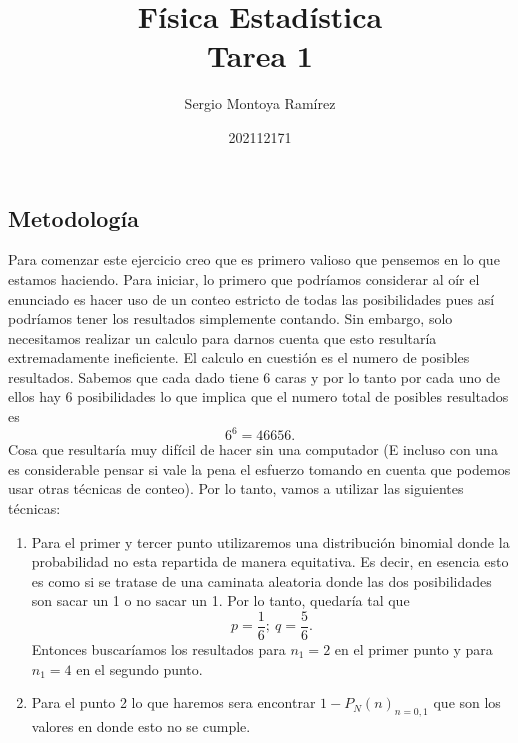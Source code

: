 \documentclass{report}
\title{\Huge{Física Estadística}\\Tarea 1}
\author{\huge{Sergio Montoya Ramírez}}
\date{202112171}
\begin{document}
\maketitle
\newpage%
\tableofcontents
\pagebreak

\chapter{}

\section*{Metodología}

Para comenzar este ejercicio creo que es primero valioso que pensemos en lo que estamos haciendo. Para iniciar, lo primero que podríamos considerar al oír el enunciado es hacer uso de un conteo estricto de todas las posibilidades pues así podríamos tener los resultados simplemente contando. Sin embargo, solo necesitamos realizar un calculo para darnos cuenta que esto resultaría extremadamente ineficiente. El calculo en cuestión es el numero de posibles resultados. Sabemos que cada dado tiene 6 caras y por lo tanto por cada uno de ellos hay 6 posibilidades lo que implica que el numero total de posibles resultados es \[
6^{6} = 46656
.\] Cosa que resultaría muy difícil de hacer sin una computador (E incluso con una es considerable pensar si vale la pena el esfuerzo tomando en cuenta que podemos usar otras técnicas de conteo). Por lo tanto, vamos a utilizar las siguientes técnicas:

\begin{enumerate}
  \item Para el primer y tercer punto utilizaremos una distribución binomial donde la probabilidad no esta repartida de manera equitativa. Es decir, en esencia esto es como si se tratase de una caminata aleatoria donde las dos posibilidades son sacar un 1 o no sacar un 1. Por lo tanto, quedaría tal que \[
  p = \frac{1}{6};\ q = \frac{5}{6}
  .\] Entonces buscaríamos los resultados para $n_1 = 2$ en el primer punto y para $n_1 = 4$ en el segundo punto.
\item Para el punto 2 lo que haremos sera encontrar $1 - P_N(n)_{n = 0, 1}$ que son los valores en donde esto no se cumple.
\end{enumerate}


\section{}
\end{document}
